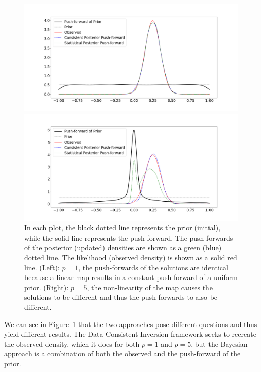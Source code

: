 \begin{ex}
\begin{figure}
\begin{minipage}{.45\textwidth}
		\includegraphics[width=\linewidth]{./images/comparison1}
\end{minipage}
\begin{minipage}{.45\textwidth}
		\includegraphics[width=\linewidth]{./images/comparison5}
\end{minipage}
\caption{
In each plot, the black dotted line represents the prior (initial), while the solid line represents the push-forward.
The push-forwards of the posterior (updated) densities are shown as a green (blue) dotted line.
The likelihood (observed density) is shown as a solid red line.
(Left): $p = 1$, the push-forwards of the solutions are identical because a linear map results in a constant push-forward of a uniform prior.
(Right): $p = 5$, the non-linearity of the map causes the solutions to be different and thus the push-forwards to also be different.
}
\label{fig:comparison}
\end{figure}

We can see in Figure~\ref{fig:comparison} that the two approaches pose different questions and thus yield different results. 
The Data-Consistent Inversion framework seeks to recreate the observed density, which it does for both $p=1$ and $p=5$, but the Bayesian approach is a combination of both the observed and the push-forward of the prior.


\end{ex}

